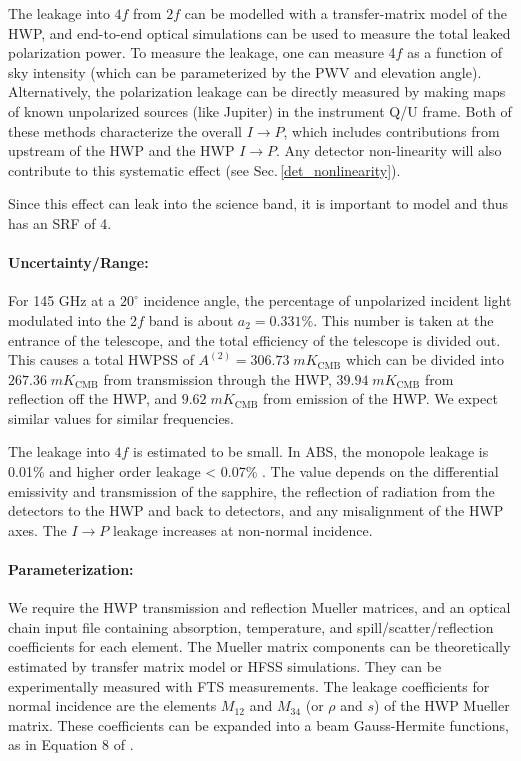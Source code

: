 The leakage into $4f$ from $2f$ can be modelled with a transfer-matrix model of the HWP, and end-to-end optical simulations can be used to measure the total leaked polarization power. To measure the leakage, one can measure 4$f$ as a function of sky intensity (which can be parameterized by the PWV and elevation angle). Alternatively, the polarization leakage can be directly measured by making maps of known unpolarized sources (like Jupiter) in the instrument Q/U frame. Both of these methods characterize the overall $I \rightarrow P$, which includes contributions from upstream of the HWP and the HWP $I \rightarrow P$. Any detector non-linearity will also contribute to this systematic effect (see Sec.\,\ref{det_nonlinearity}).

Since this effect can leak into the science band, it is important to model and thus has an SRF of 4.

\paragraph{Uncertainty/Range:} 
For 145 GHz at a $20^\circ$ incidence angle, 
the percentage of unpolarized incident light modulated into the 2$f$ band is about  $a_2 = 0.331\%$. 
This number is taken at the entrance of the telescope, and the total efficiency of the telescope is divided out.
This causes a total HWPSS of $A^{(2)} = 306.73\; mK_\text{CMB}$ which can be divided into $267.36 \;mK_\text{CMB}$ from transmission through the HWP, $39.94 \;mK_\text{CMB}$ from reflection off the HWP, and $9.62 \;mK_\text{CMB}$ from emission of the HWP. We expect similar values for similar frequencies.

The leakage into $4f$ is estimated to be small. In ABS, the monopole leakage is 0.01\% and higher order leakage < 0.07\% \cite{Essinger-Hileman2016}. The value depends on the differential emissivity and transmission of the sapphire, the reflection of radiation from the detectors to the HWP and back to detectors, and any misalignment of the HWP axes. The $I \rightarrow P$ leakage increases at non-normal incidence.

\paragraph{Parameterization:}
We require the HWP transmission and reflection Mueller matrices\cite{Salatino16}, and an optical chain input file containing
absorption, temperature, and spill/scatter/reflection coefficients for each element. The Mueller matrix components can be theoretically estimated by transfer matrix model \cite{Essinger-Hileman13} or HFSS simulations. They can be experimentally measured with FTS measurements. The leakage coefficients for normal incidence are the elements $M_{12}$ and $M_{34}$ (or $\rho$ and $s$) of the HWP Mueller matrix. These coefficients can be expanded into a beam Gauss-Hermite functions, as in Equation 8 of \cite{Essinger-Hileman2016}.

